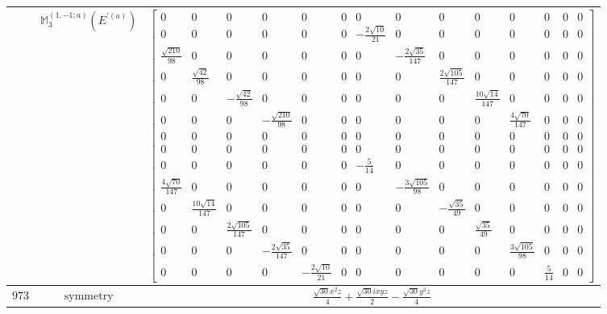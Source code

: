 \documentclass[fleqn,8pt,landscape]{jsarticle}
\begin{document}
\begin{longtable}{ccc}
$  $ & $ \mathbb{M}_{3}^{(1,-1;a)}(E^{\prime(a)}) $ & $ \begin{bmatrix} 0 & 0 & 0 & 0 & 0 & 0 & 0 & 0 & 0 & 0 & 0 & 0 & 0 & 0 \\ 0 & 0 & 0 & 0 & 0 & 0 & - \frac{2 \sqrt{10}}{21} & 0 & 0 & 0 & 0 & 0 & 0 & 0 \\ \frac{\sqrt{210}}{98} & 0 & 0 & 0 & 0 & 0 & 0 & - \frac{2 \sqrt{35}}{147} & 0 & 0 & 0 & 0 & 0 & 0 \\ 0 & \frac{\sqrt{42}}{98} & 0 & 0 & 0 & 0 & 0 & 0 & \frac{2 \sqrt{105}}{147} & 0 & 0 & 0 & 0 & 0 \\ 0 & 0 & - \frac{\sqrt{42}}{98} & 0 & 0 & 0 & 0 & 0 & 0 & \frac{10 \sqrt{14}}{147} & 0 & 0 & 0 & 0 \\ 0 & 0 & 0 & - \frac{\sqrt{210}}{98} & 0 & 0 & 0 & 0 & 0 & 0 & \frac{4 \sqrt{70}}{147} & 0 & 0 & 0 \\ 0 & 0 & 0 & 0 & 0 & 0 & 0 & 0 & 0 & 0 & 0 & 0 & 0 & 0 \\ 0 & 0 & 0 & 0 & 0 & 0 & 0 & 0 & 0 & 0 & 0 & 0 & 0 & 0 \\ 0 & 0 & 0 & 0 & 0 & 0 & - \frac{5}{14} & 0 & 0 & 0 & 0 & 0 & 0 & 0 \\ \frac{4 \sqrt{70}}{147} & 0 & 0 & 0 & 0 & 0 & 0 & - \frac{3 \sqrt{105}}{98} & 0 & 0 & 0 & 0 & 0 & 0 \\ 0 & \frac{10 \sqrt{14}}{147} & 0 & 0 & 0 & 0 & 0 & 0 & - \frac{\sqrt{35}}{49} & 0 & 0 & 0 & 0 & 0 \\ 0 & 0 & \frac{2 \sqrt{105}}{147} & 0 & 0 & 0 & 0 & 0 & 0 & \frac{\sqrt{35}}{49} & 0 & 0 & 0 & 0 \\ 0 & 0 & 0 & - \frac{2 \sqrt{35}}{147} & 0 & 0 & 0 & 0 & 0 & 0 & \frac{3 \sqrt{105}}{98} & 0 & 0 & 0 \\ 0 & 0 & 0 & 0 & - \frac{2 \sqrt{10}}{21} & 0 & 0 & 0 & 0 & 0 & 0 & \frac{5}{14} & 0 & 0 \end{bmatrix} $ \\ \hline
$ 973 $ & $ \text{symmetry} $ & $ \frac{\sqrt{30} x^{2} z}{4} + \frac{\sqrt{30} i x y z}{2} - \frac{\sqrt{30} y^{2} z}{4} $ \\

\end{longtable}
\end{document}
